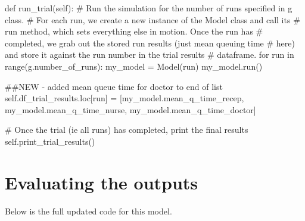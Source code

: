 \documentclass[
  letterpaper,
  DIV=11,
  numbers=noendperiod]{scrreprt}
\newenvironment{Shaded}{}{}
\newcommand{\BuiltInTok}[1]{\textcolor[rgb]{0.84,0.23,0.29}{#1}}
\newcommand{\CommentTok}[1]{\textcolor[rgb]{0.42,0.45,0.49}{#1}}
\newcommand{\ControlFlowTok}[1]{\textcolor[rgb]{0.84,0.23,0.29}{#1}}
\newcommand{\KeywordTok}[1]{\textcolor[rgb]{0.84,0.23,0.29}{#1}}
\newcommand{\NormalTok}[1]{\textcolor[rgb]{0.14,0.16,0.18}{#1}}
\newcommand{\OperatorTok}[1]{\textcolor[rgb]{0.14,0.16,0.18}{#1}}
\newcommand{\VariableTok}[1]{\textcolor[rgb]{0.89,0.38,0.04}{#1}}
\begin{document}
\begin{Shaded}
\begin{Highlighting}[]
  \KeywordTok{def}\NormalTok{ run\_trial(}\VariableTok{self}\NormalTok{):}
      \CommentTok{\# Run the simulation for the number of runs specified in g class.}
      \CommentTok{\# For each run, we create a new instance of the Model class and call its}
      \CommentTok{\# run method, which sets everything else in motion.  Once the run has}
      \CommentTok{\# completed, we grab out the stored run results (just mean queuing time}
      \CommentTok{\# here) and store it against the run number in the trial results}
      \CommentTok{\# dataframe.}
      \ControlFlowTok{for}\NormalTok{ run }\KeywordTok{in} \BuiltInTok{range}\NormalTok{(g.number\_of\_runs):}
\NormalTok{          my\_model }\OperatorTok{=}\NormalTok{ Model(run)}
\NormalTok{          my\_model.run()}

          \CommentTok{\#\#NEW {-} added mean queue time for doctor to end of list}
          \VariableTok{self}\NormalTok{.df\_trial\_results.loc[run] }\OperatorTok{=}\NormalTok{ [my\_model.mean\_q\_time\_recep,}
\NormalTok{                                            my\_model.mean\_q\_time\_nurse,}
\NormalTok{                                            my\_model.mean\_q\_time\_doctor]}

      \CommentTok{\# Once the trial (ie all runs) has completed, print the final results}
      \VariableTok{self}\NormalTok{.print\_trial\_results()}
\end{Highlighting}
\end{Shaded}

\section{Evaluating the outputs}\label{evaluating-the-outputs-1}

Below is the full updated code for this model.
\end{document}
